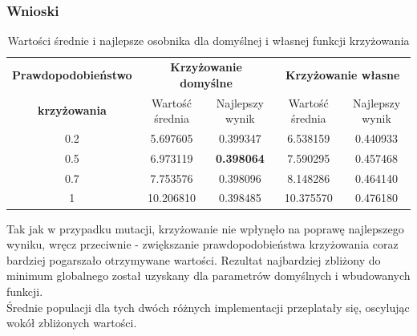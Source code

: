 \vline

\subsubsection{Wnioski}

\begin{table}[!h]
	\centering
	\caption{Wartości średnie i najlepsze osobnika dla domyślnej i własnej funkcji krzyżowania}
	\label{cross_porownanie}
	\hspace*{-0.5in}
	\begin{tabular}{|c|c|c|c|c|}
		\hline
		\textbf{Prawdopodobieństwo} & \multicolumn{2}{c}{\textbf{Krzyżowanie domyślne}}  & \multicolumn{2}{|c|}{\textbf{Krzyżowanie własne}} \\ \cline{2-5}
		\textbf{krzyżowania} & Wartość średnia & Najlepszy wynik & Wartość średnia & Najlepszy wynik \\ \hline
		
		0.2 & 5.697605 & 0.399347 & 6.538159 & 0.440933 \\
		0.5 & 6.973119 & \textbf{{\color{green} 0.398064 }} & 7.590295 & 0.457468 \\
		0.7 & 7.753576 & 0.398096 & 8.148286 & 0.464140 \\
		1   & 10.206810 & 0.398485 & 10.375570 & 0.476180  \\ \hline      
	\end{tabular}
\end{table}

Tak jak w przypadku mutacji, krzyżowanie nie wpłynęło na poprawę najlepszego wyniku, wręcz przeciwnie - zwiększanie prawdopodobieństwa krzyżowania coraz bardziej pogarszało otrzymywane wartości. Rezultat najbardziej zbliżony do minimum globalnego został uzyskany dla parametrów domyślnych i wbudowanych funkcji.\\
Średnie populacji dla tych dwóch różnych implementacji przeplatały się, oscylując wokół zbliżonych wartości.